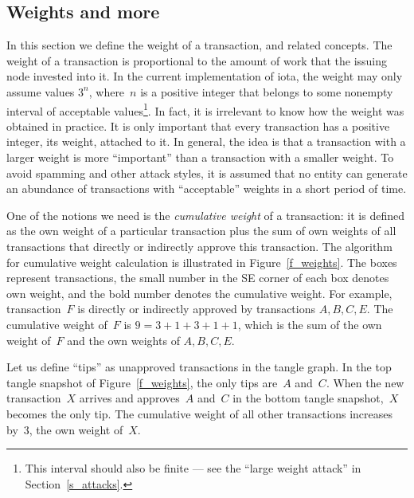 \documentclass[12pt]{article}
\begin{document}
\begin{CJK}{UTF8}{bkai}
\section{Weights and more}
\label{s_weight_algo}
In this section we define the weight of a transaction, 
and related concepts. The weight of a transaction is 
proportional to the amount of work that the issuing node invested 
into it. In 
the current implementation of iota,
the weight may only assume values $3^n$, 
where~$n$ is a positive integer that belongs to 
some nonempty interval of acceptable values\footnote{This
interval should also be finite --- see the ``large weight 
attack'' in Section~\ref{s_attacks}.}.
In fact,
it is irrelevant to know how the weight
was obtained in practice. 
It is only important that every transaction
has a positive integer, its weight,
attached to it. 
 In general, the idea is that a transaction with a
 larger weight is more ``important'' than a transaction
 with a smaller weight.
 To avoid spamming and 
 other attack styles, it is assumed that
 no entity can generate
an abundance of transactions with ``acceptable'' weights
 in a short period of time.

One of the notions we need is the \emph{cumulative weight}
of a transaction:
it is defined as the own weight of a particular transaction plus
the sum of own weights of all transactions that directly or indirectly approve
this transaction.
The algorithm for cumulative weight calculation is illustrated in 
Figure~\ref{f_weights}. The boxes represent transactions,
the small number in the SE corner of each box denotes own weight, and the 
bold number denotes
the cumulative weight. For example, transaction~$F$
is directly or indirectly approved
by transactions
$A,B,C,E$. The cumulative weight of~$F$ is
$9=3+1+3+1+1$, which is the sum of the own weight of~$F$ and the 
own weights of $A,B,C,E$.

 Let us define ``tips'' as unapproved transactions 
 in the tangle graph.
 In the top 
 tangle snapshot of 
Figure~\ref{f_weights}, the only 
tips are~$A$ and~$C$.
When the new transaction~$X$ 
arrives and approves~$A$ and~$C$ in the bottom 
tangle snapshot,~$X$ becomes the only tip.
 The cumulative weight of all other transactions
increases by~$3$, the own weight of~$X$.



\end{CJK}
\end{document}
